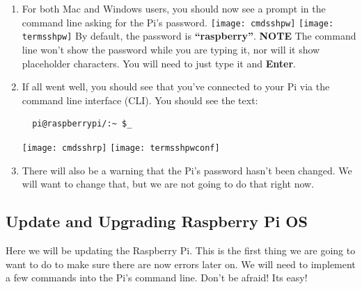 \documentclass{article}
\begin{document}
\begin{enumerate}
  \item For both Mac and Windows users, you should now see a prompt in the command line asking for the Pi's password.
  \newline
  \newline
  \texttt{[image: cmdsshpw]}
  \texttt{[image: termsshpw]}
  \newline
  \newline
  By default, the password is \textbf{``raspberry''}. 
  \newline 
  \newline 
  \textbf{NOTE} The command line won't show the password while you are typing it, nor will it show placeholder characters. You will need to just type it and \textbf{Enter}.
  \item If all went well, you should see that you've connected to your Pi via the command line interface (CLI). You should see the text: 
  \begin{lstlisting}
  pi@raspberrypi/:~ $_ 
  \end{lstlisting}
  \texttt{[image: cmdsshrp]}
  \texttt{[image: termsshpwconf]}
  \item There will also be a warning that the Pi's password hasn't been changed. We will want to change that, but we are not going to do that right now.
\end{enumerate}

\subsection{Update and Upgrading Raspberry Pi OS} 
\label{updateupgrade}

Here we will be updating the Raspberry Pi. This is the first thing we are going to want to do to make sure there are now errors later on. We will need to implement a few commands into the Pi's command line. Don't be afraid! Its easy!
\end{document}
